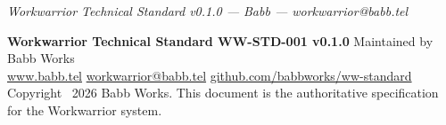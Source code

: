 \documentclass[11pt, a4paper, DIV=14]{scrartcl}
\let\origRule\rule
\renewcommand{\rule}[2]{\par\noindent{\color{BabbBorder}\origRule{#1}{#2}}\par}
\begin{document}
\begin{center}\rule{0.5\linewidth}{0.5pt}\end{center}

\emph{Workwarrior Technical Standard v0.1.0 --- Babb ---
workwarrior@babb.tel}

\vspace{12pt}
\noindent{\color{BabbBorder}\origRule{\linewidth}{0.5pt}}
\vspace{4pt}

{\footnotesize\sffamily\color{BabbGray}
\textbf{Workwarrior Technical Standard WW-STD-001 v0.1.0}
\enspace\textbar\enspace Maintained by Babb Works\\
\href{https://www.babb.tel}{www.babb.tel}
\enspace\textbar\enspace
\href{mailto:workwarrior@babb.tel}{workwarrior@babb.tel}
\enspace\textbar\enspace
\href{https://github.com/babbworks/ww-standard}{github.com/babbworks/ww-standard}\\[2pt]
Copyright \textcopyright~2026 Babb Works.
This document is the authoritative specification for the Workwarrior system.
}
\end{document}
